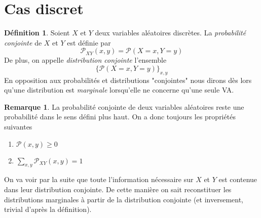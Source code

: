 \documentclass[a4paper,12pt]{report}
\theoremstyle{definition}
\renewcommand{\(}{\left(}
\renewcommand{\)}{\right)}
\renewcommand{\P}{\mathcal{P}}
\renewcommand{\d}{\textit}
\newtheorem{defn}[thm]{Définition}
\newtheorem{rmk}[thm]{Remarque}
\begin{document}
    \section{Cas discret}
            
        \begin{leftbar}
        \begin{defn}
            Soient $X$ et $Y$ deux variables aléatoires discrètes. La \d{probabilité conjointe} de $X$ et $Y$ est définie par
            $$\P_{XY}(x,y) = \P(X=x,Y=y)$$
            De plus, on appelle \d{distribution conjointe} l'ensemble 
            $$\{\P(X=x,Y=y)\}_{x,y}$$
            En opposition aux probabilités et distributions "conjointes" nous dirons dès lors qu'une distribution est \d{marginale} lorsqu'elle ne concerne qu'une seule VA.
        \end{defn}
        \end{leftbar}

        
        \begin{rmk}
            La probabilité conjointe de deux variables aléatoires reste une probabilité dans le sens défini plus haut. On a donc toujours les propriétés suivantes
            \begin{enumerate}[label=(\roman*)]
                \item $\P(x,y)\geq 0$
                \item $\sum_{x,y}\P_{XY}(x,y) = 1$
            \end{enumerate}
        \end{rmk}
        
        On va voir par la suite que toute l'information nécessaire sur $X$ et $Y$ est contenue dans leur distribution conjointe. De cette manière on sait reconstituer les distributions marginales à partir de la distribution conjointe (et inversement, trivial d'après la définition).
        
\end{document}
